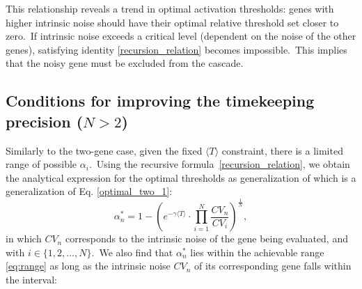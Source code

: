 \documentclass[aps,prb,reprint,superscriptaddress]{revtex4-2}
\begin{document}
This relationship reveals a trend in optimal activation thresholds: genes with higher intrinsic noise should have their optimal relative threshold set closer to zero.~If intrinsic noise exceeds a critical level (dependent on the noise of the other genes), satisfying identity \eqref{recursion_relation} becomes impossible.~This implies that the noisy gene must be excluded from the cascade.





\subsection*{Conditions for improving the timekeeping precision ($N>2$)}


Similarly to the two-gene case, given the fixed $\langle T\rangle$ constraint, there is a limited range of possible $\alpha_i$.~Using the recursive formula~\eqref{recursion_relation}, we obtain the analytical expression for the optimal thresholds as generalization of which is a generalization of Eq. \eqref{optimal_two_1}:
\begin{equation}\label{optimal_general}
    \alpha^*_{n} = 1-\left(e^{-\gamma\langle T \rangle}\cdot\prod\limits_{i=1}^{N}\frac{CV_n}{CV_{i}}\right)^{\frac{1}{N}},
\end{equation}
in which $CV_n$ corresponds to the intrinsic noise of the gene being evaluated, and with \( i \in \{1, 2, \dots, N\} \).~We also find that $\alpha^*_n$ lies within the achievable range \eqref{eq:range} as long as the intrinsic noise $CV_n$ of its corresponding gene falls within the interval:
\end{document}
